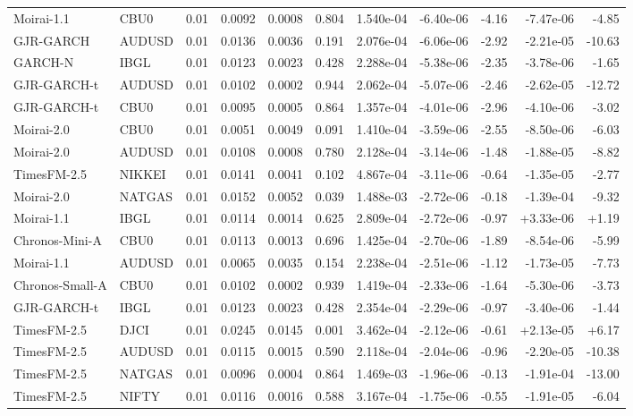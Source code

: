 \begin{tabular}{llrrrrrrrrr}
Moirai-1.1 & CBU0 & 0.01 & 0.0092 & 0.0008 & 0.804 & 1.540e-04 & -6.40e-06 & -4.16 & -7.47e-06 & -4.85 \\
GJR-GARCH & AUDUSD & 0.01 & 0.0136 & 0.0036 & 0.191 & 2.076e-04 & -6.06e-06 & -2.92 & -2.21e-05 & -10.63 \\
GARCH-N & IBGL & 0.01 & 0.0123 & 0.0023 & 0.428 & 2.288e-04 & -5.38e-06 & -2.35 & -3.78e-06 & -1.65 \\
GJR-GARCH-t & AUDUSD & 0.01 & 0.0102 & 0.0002 & 0.944 & 2.062e-04 & -5.07e-06 & -2.46 & -2.62e-05 & -12.72 \\
GJR-GARCH-t & CBU0 & 0.01 & 0.0095 & 0.0005 & 0.864 & 1.357e-04 & -4.01e-06 & -2.96 & -4.10e-06 & -3.02 \\
Moirai-2.0 & CBU0 & 0.01 & 0.0051 & 0.0049 & 0.091 & 1.410e-04 & -3.59e-06 & -2.55 & -8.50e-06 & -6.03 \\
Moirai-2.0 & AUDUSD & 0.01 & 0.0108 & 0.0008 & 0.780 & 2.128e-04 & -3.14e-06 & -1.48 & -1.88e-05 & -8.82 \\
TimesFM-2.5 & NIKKEI & 0.01 & 0.0141 & 0.0041 & 0.102 & 4.867e-04 & -3.11e-06 & -0.64 & -1.35e-05 & -2.77 \\
Moirai-2.0 & NATGAS & 0.01 & 0.0152 & 0.0052 & 0.039 & 1.488e-03 & -2.72e-06 & -0.18 & -1.39e-04 & -9.32 \\
Moirai-1.1 & IBGL & 0.01 & 0.0114 & 0.0014 & 0.625 & 2.809e-04 & -2.72e-06 & -0.97 & +3.33e-06 & +1.19 \\
Chronos-Mini-A & CBU0 & 0.01 & 0.0113 & 0.0013 & 0.696 & 1.425e-04 & -2.70e-06 & -1.89 & -8.54e-06 & -5.99 \\
Moirai-1.1 & AUDUSD & 0.01 & 0.0065 & 0.0035 & 0.154 & 2.238e-04 & -2.51e-06 & -1.12 & -1.73e-05 & -7.73 \\
Chronos-Small-A & CBU0 & 0.01 & 0.0102 & 0.0002 & 0.939 & 1.419e-04 & -2.33e-06 & -1.64 & -5.30e-06 & -3.73 \\
GJR-GARCH-t & IBGL & 0.01 & 0.0123 & 0.0023 & 0.428 & 2.354e-04 & -2.29e-06 & -0.97 & -3.40e-06 & -1.44 \\
TimesFM-2.5 & DJCI & 0.01 & 0.0245 & 0.0145 & 0.001 & 3.462e-04 & -2.12e-06 & -0.61 & +2.13e-05 & +6.17 \\
TimesFM-2.5 & AUDUSD & 0.01 & 0.0115 & 0.0015 & 0.590 & 2.118e-04 & -2.04e-06 & -0.96 & -2.20e-05 & -10.38 \\
TimesFM-2.5 & NATGAS & 0.01 & 0.0096 & 0.0004 & 0.864 & 1.469e-03 & -1.96e-06 & -0.13 & -1.91e-04 & -13.00 \\
TimesFM-2.5 & NIFTY & 0.01 & 0.0116 & 0.0016 & 0.588 & 3.167e-04 & -1.75e-06 & -0.55 & -1.91e-05 & -6.04 \\

\end{tabular}
